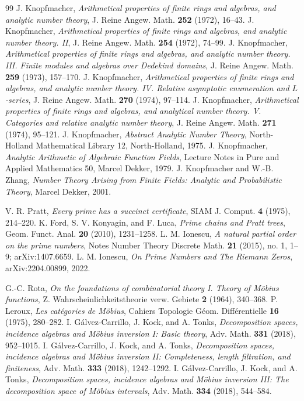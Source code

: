 \documentclass[11pt]{article}
\begin{document}
\begin{thebibliography}{99}
 J. Knopfmacher, \emph{Arithmetical properties of finite rings and algebras, and analytic number theory}, J. Reine Angew. Math. \textbf{252} (1972), 16--43.
 J. Knopfmacher, \emph{Arithmetical properties of finite rings and algebras, and analytic number theory. II}, J. Reine Angew. Math. \textbf{254} (1972), 74--99.
 J. Knopfmacher, \emph{Arithmetical properties of finite rings and algebras, and analytic number theory. III. Finite modules and algebras over Dedekind domains}, J. Reine Angew. Math. \textbf{259} (1973), 157--170.
 J. Knopfmacher, \emph{Arithmetical properties of finite rings and algebras, and analytic number theory. IV. Relative asymptotic enumeration and $L$-series}, J. Reine Angew. Math. \textbf{270} (1974), 97--114.
 J. Knopfmacher, \emph{Arithmetical properties of finite rings and algebras, and analytical number theory. V. Categories and relative analytic number theory}, J. Reine Angew. Math. \textbf{271} (1974), 95--121.
 J. Knopfmacher, \emph{Abstract Analytic Number Theory}, North-Holland Mathematical Library 12, North-Holland, 1975.
 J. Knopfmacher, \emph{Analytic Arithmetic of Algebraic Function Fields}, Lecture Notes in Pure and Applied Mathematics 50, Marcel Dekker, 1979.
 J. Knopfmacher and W.-B. Zhang, \emph{Number Theory Arising from Finite Fields: Analytic and Probabilistic Theory}, Marcel Dekker, 2001.

 V. R. Pratt, \emph{Every prime has a succinct certificate}, SIAM J. Comput. \textbf{4} (1975), 214--220.
 K. Ford, S. V. Konyagin, and F. Luca, \emph{Prime chains and Pratt trees}, Geom. Funct. Anal. \textbf{20} (2010), 1231--1258.
 L. M. Ionescu, \emph{A natural partial order on the prime numbers}, Notes Number Theory Discrete Math. \textbf{21} (2015), no. 1, 1--9; arXiv:1407.6659.
 L. M. Ionescu, \emph{On Prime Numbers and The Riemann Zeros}, arXiv:2204.00899, 2022.

 G.-C. Rota, \emph{On the foundations of combinatorial theory I. Theory of M\"obius functions}, Z. Wahrscheinlichkeitstheorie verw. Gebiete \textbf{2} (1964), 340--368.
 P. Leroux, \emph{Les cat\'egories de M\"obius}, Cahiers Topologie G\'eom. Diff\'erentielle \textbf{16} (1975), 280--282.
 I. G\'alvez-Carrillo, J. Kock, and A. Tonks, \emph{Decomposition spaces, incidence algebras and M\"obius inversion I: Basic theory}, Adv. Math. \textbf{331} (2018), 952--1015.
 I. G\'alvez-Carrillo, J. Kock, and A. Tonks, \emph{Decomposition spaces, incidence algebras and M\"obius inversion II: Completeness, length filtration, and finiteness}, Adv. Math. \textbf{333} (2018), 1242--1292.
 I. G\'alvez-Carrillo, J. Kock, and A. Tonks, \emph{Decomposition spaces, incidence algebras and M\"obius inversion III: The decomposition space of M\"obius intervals}, Adv. Math. \textbf{334} (2018), 544--584.


\end{thebibliography}
\end{document}
